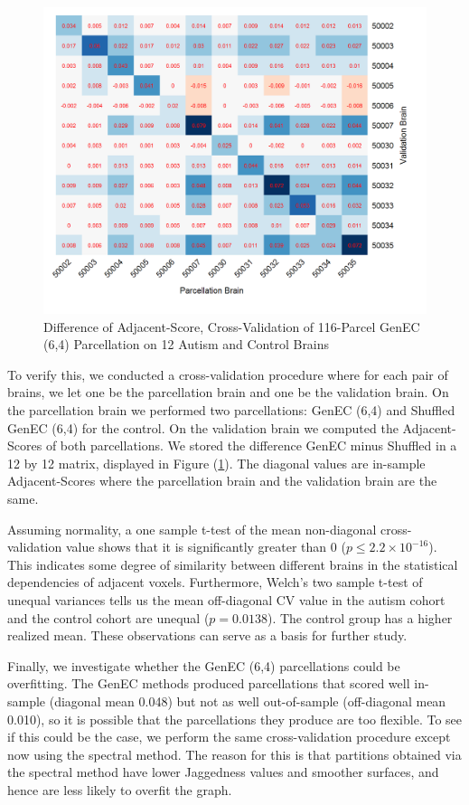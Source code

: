 \begin{figure}
\caption{Difference of Adjacent-Score, Cross-Validation of 116-Parcel
GenEC (6,4) Parcellation on 12 Autism and Control Brains}
\label{cv_ec}
\includegraphics[scale = 1]{figs/8_cv_ec.png}
\end{figure}

To verify this, we conducted a cross-validation procedure where
for each pair of brains, we let one be the parcellation brain and one
be the validation brain. On the parcellation brain we performed two
parcellations: GenEC (6,4) and Shuffled GenEC (6,4) for the control.
On the validation brain we computed the Adjacent-Scores of both
parcellations. We stored the difference GenEC minus Shuffled in a
12 by 12 matrix, displayed in Figure (\ref{cv_ec}). The diagonal values
are in-sample Adjacent-Scores where the parcellation brain and the
validation brain are the same.

Assuming normality, a one sample t-test of the mean non-diagonal
cross-validation value shows that it is significantly greater than 0
($p \leq 2.2 \times 10^{-16}$). This indicates some degree of similarity
between different brains in the statistical dependencies of adjacent
voxels. Furthermore, Welch's two sample t-test of unequal variances
tells us the mean off-diagonal CV value in the autism cohort and the
control cohort are unequal ($p = 0.0138$). The control group has a
higher realized mean. These observations can serve as a basis for
further study.

Finally, we investigate whether the GenEC (6,4) parcellations could be
overfitting. The GenEC methods produced parcellations that scored well
in-sample (diagonal mean 0.048) but not as well out-of-sample
(off-diagonal mean 0.010), so it is possible that the parcellations
they produce are too flexible. To see if this could be the case, we
perform the same cross-validation procedure except now using the
spectral method. The reason for this is that partitions obtained via the
spectral method have lower Jaggedness values and smoother surfaces,
and hence are less likely to overfit the graph.


